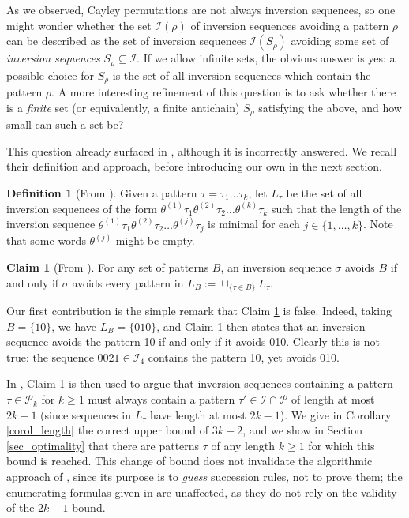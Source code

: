 \documentclass[a4paper,11pt]{article}
\theoremstyle{definition}
\newtheorem{defn}[thm]{Definition}
\newtheorem{claim}[thm]{Claim}
\theoremstyle{remark}
\newcommand{\I}{\mathcal{I}}
\renewcommand{\P}{\mathcal{P}}
\begin{document}
As we observed, Cayley permutations are not always inversion sequences, so one might wonder whether the set $\I(\rho)$ of inversion sequences avoiding a pattern $\rho$ can be described as the set of inversion sequences $\I(S_\rho)$ avoiding some set of \emph{inversion sequences} $S_\rho \subseteq \I$. If we allow infinite sets, the obvious answer is yes: a possible choice for $S_\rho$ is the set of all inversion sequences which contain the pattern $\rho$. A more interesting refinement of this question is to ask whether there is a \emph{finite} set (or equivalently, a finite antichain) $S_\rho$ satisfying the above, and how small can such a set be?

This question already surfaced in \cite[page 3]{Kotsireas_Mansour_Yildirim_2024}, although it is incorrectly answered. We recall their definition and approach, before introducing our own in the next section.
\begin{defn}[From \cite{Kotsireas_Mansour_Yildirim_2024}]
    Given a pattern $\tau = \tau_1 \dots \tau_k$, let $L_\tau$ be the set of all inversion sequences of the form $\theta^{(1)} \tau_1 \theta^{(2)} \tau_2 \dots \theta^{(k)} \tau_k$ such that the length of the inversion sequence $\theta^{(1)} \tau_1 \theta^{(2)} \tau_2 \dots \theta^{(j)} \tau_j$ is minimal for each $j \in \{1, \dots, k\}$. Note that some words $\theta^{(j)}$ might be empty.
\end{defn}
\begin{claim}[From \cite{Kotsireas_Mansour_Yildirim_2024}] \label{cl1}
    For any set of patterns $B$, an inversion sequence $\sigma$ avoids $B$ if and only if $\sigma$ avoids every pattern in $L_B :=\cup_{\{\tau \in B\}}L_\tau$.
\end{claim}

Our first contribution is the simple remark that Claim \ref{cl1} is false. Indeed, taking $B = \{10\}$, we have $L_B = \{010\}$, and Claim \ref{cl1} then states that an inversion sequence avoids the pattern 10 if and only if it avoids 010. Clearly this is not true: the sequence $0021 \in \I_4$ contains the pattern 10, yet avoids 010.

In \cite{Kotsireas_Mansour_Yildirim_2024}, Claim \ref{cl1} is then used to argue that inversion sequences containing a pattern $\tau \in \P_k$ for $k \geq 1$ must always contain a pattern $\tau' \in \I \cap \P$ of length at most $2k-1$ (since sequences in $L_\tau$ have length at most $2k-1$).
We give in Corollary \ref{corol_length} the correct upper bound of $3k - 2$, and we show in Section \ref{sec_optimality} that there are patterns $\tau$ of any length $k \geq 1$ for which this bound is reached.
This change of bound does not invalidate the algorithmic approach of \cite{Kotsireas_Mansour_Yildirim_2024}, since its purpose is to \emph{guess} succession rules, not to prove them; the enumerating formulas given in \cite{Kotsireas_Mansour_Yildirim_2024} are unaffected, as they do not rely on the validity of the $2k-1$ bound.
\end{document}
